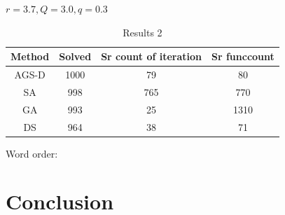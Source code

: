 \documentclass[runningheads]{llncs}
\begin{document}
$r=3.7,Q=3.0,q=0.3$

\begin{table}[h]
	\caption{Results 2}
	\begin{center}
		\begin{tabular}{|c|c|c|c|}
			\hline
			Method & Solved & Sr count of iteration & Sr funccount \\
			\hline
			\hline
                                AGS-D & 1000  & 79  &  80 \\
                                \hline
                                SA    &  998  &  765  &  770  \\
			\hline
			GA    &   993  &  25  &  1310  \\
			\hline
                                DS    &  964  & 38  &  71  \\
			\hline
		\end{tabular}
	\end{center}
\end{table}




Word order:

\cite{Sergeyev2013}
\cite{PaulaviciusZilinskas2014}
\cite{Sergeyev2017}
\cite{Horst1995}
\cite{Horst1996}
\cite{Pinter1996}
\cite{Jones2009}

\cite{Evtushenko2009}
\cite{Paulavicius2011}
\cite{Evtushenko2013}
\cite{Strongin2000}

\cite{Moreau2000}

\cite{Batukhtin1993}
\cite{Batukhtin1998}
\cite{Ban2019}

\cite{ZhangXu}
\cite{Audet}

\cite{Goldberg}
\cite{Kirkpatrick}
\cite{MatlabOTB}


\section{Conclusion}




%
%
%
 
 
\end{document}
